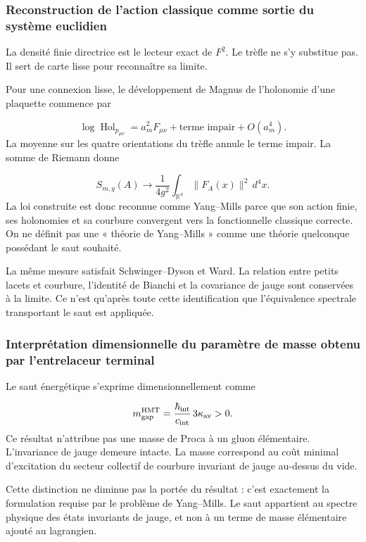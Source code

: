 \subsubsection{Reconstruction de l’action classique comme sortie du système euclidien}
La densité finie directrice est le lecteur exact de \(F^2\). Le trèfle ne s’y substitue pas. Il sert de carte lisse pour reconnaître sa limite.\par
Pour une connexion lisse, le développement de Magnus de l’holonomie d’une plaquette commence par\par
\[
\log\operatorname{Hol}_{p_{\mu\nu}}
=
a_m^2F_{\mu\nu}
+\text{terme impair}
+O(a_m^4).
\]
La moyenne sur les quatre orientations du trèfle annule le terme impair. La somme de Riemann donne\par
\[
S_{m,g}(A)
\longrightarrow
\frac1{4g^2}
\int_{\mathbb R^4}\|F_A(x)\|^2\,d^4x.
\]
La loi construite est donc reconnue comme Yang–Mills parce que son action finie, ses holonomies et sa courbure convergent vers la fonctionnelle classique correcte. On ne définit pas une « théorie de Yang–Mills » comme une théorie quelconque possédant le saut souhaité.\par
La même mesure satisfait Schwinger–Dyson et Ward. La relation entre petits lacets et courbure, l’identité de Bianchi et la covariance de jauge sont conservées à la limite. Ce n’est qu’après toute cette identification que l’équivalence spectrale transportant le saut est appliquée.\par
{}
\subsubsection{Interprétation dimensionnelle du paramètre de masse obtenu par l’entrelaceur terminal}
Le saut énergétique s’exprime dimensionnellement comme\par
\[
m_{\rm gap}^{\rm HMT}
=
\frac{\hbar_{\rm int}}{c_{\rm int}}
\,3\kappa_{\rm av}>0.
\]
Ce résultat n’attribue pas une masse de Proca à un gluon élémentaire. L’invariance de jauge demeure intacte. La masse correspond au coût minimal d’excitation du secteur collectif de courbure invariant de jauge au-dessus du vide.\par
Cette distinction ne diminue pas la portée du résultat : c’est exactement la formulation requise par le problème de Yang–Mills. Le saut appartient au spectre physique des états invariants de jauge, et non à un terme de masse élémentaire ajouté au lagrangien.\par
{}

